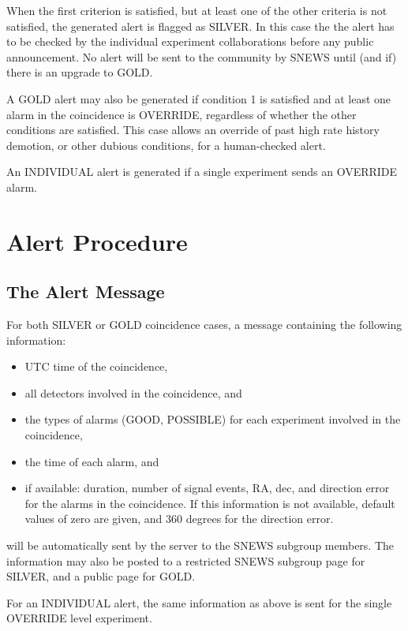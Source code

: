 \documentclass{article}
\begin{document}
When the first criterion is satisfied, but at least one of the other
criteria is not satisfied, the generated alert is flagged as SILVER.
In this case the the alert has to be checked by the individual
experiment collaborations before any public announcement. No alert
will be sent to the community by SNEWS until (and if) there is an
upgrade to GOLD.

A GOLD alert may also be generated if condition 1 is satisfied and
at least one alarm in the coincidence is OVERRIDE, 
regardless of whether the other conditions
are satisfied. This case allows an override of past high rate history
demotion, or other dubious conditions,  for a human-checked alert.

An INDIVIDUAL alert is generated if a single experiment sends
an OVERRIDE alarm.

\section{Alert Procedure}

\subsection{The Alert Message}

For both SILVER or GOLD coincidence cases, a message containing the following
information:

\begin{itemize}
\item UTC time of the coincidence,
\item all detectors involved in the coincidence, and
\item the types of alarms (GOOD, POSSIBLE) for each experiment involved
in the coincidence, 
\item the time of each alarm, and
\item if available: duration, number of signal events, RA, dec, and 
direction error
for the alarms in the coincidence.  If this information is not
available, default values of zero are given, and 360 degrees for the 
direction error.
\end{itemize}

will be automatically sent by the server to the SNEWS subgroup
members.   The information may also be posted to a restricted SNEWS
subgroup page for SILVER, and a public page for GOLD.  

For an INDIVIDUAL alert, the same information as above is sent
for the single OVERRIDE level experiment.
\end{document}
